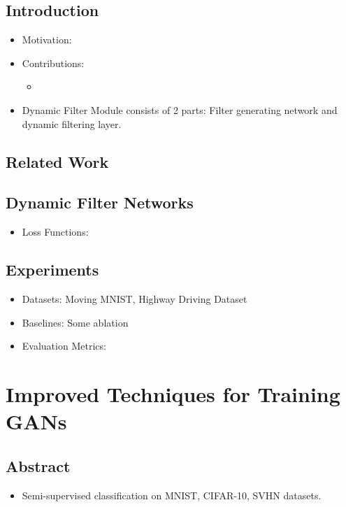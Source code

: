 \documentclass{article}
\begin{document}
    \subsection{Introduction}\label{subsec:Dynamic_Filter_Networks:introduction}
    \begin{itemize}
        \item Motivation:
        \item Contributions:
        \begin{itemize}
            \item
        \end{itemize}
        \item Dynamic Filter Module consists of 2 parts: Filter generating network and dynamic filtering layer.
    \end{itemize}

    \subsection{Related Work}\label{subsec:Dynamic_Filter_Networks:related-work}

    \subsection{Dynamic Filter Networks}\label{subsec:Dynamic_Filter_Networks:dfn}
    \begin{itemize}
        \item Loss Functions:
    \end{itemize}

    \subsection{Experiments}\label{subsec:Dynamic_Filter_Networks:experiments}
    \begin{itemize}
        \item Datasets: Moving MNIST, Highway Driving Dataset
        \item Baselines: Some ablation
        \item Evaluation Metrics:
    \end{itemize}
    \newpage


    \section{Improved Techniques for Training GANs}\label{sec:Improved_Techniques_for_Training_GANs}
    \subsection*{Abstract}
    \begin{itemize}
        \item Semi-supervised classification on MNIST, CIFAR-10, SVHN datasets.
    \end{itemize}
\end{document}
